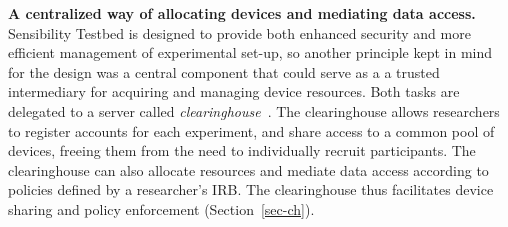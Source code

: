\textbf{A centralized way of allocating devices and mediating data access.}
Sensibility Testbed is designed to provide both enhanced security and more efficient management of experimental set-up, so another principle kept in mind for the design was a central component that could serve as a a trusted intermediary for acquiring and managing device resources. Both tasks are delegated to  a server called \textit{clearinghouse}~\cite{ch}. The clearinghouse allows researchers to 
register accounts for each experiment, and share access to a common 
pool of devices, freeing them from the need to individually recruit participants. 
The clearinghouse can also allocate resources and mediate 
data access according to policies defined by a researcher's IRB. The 
clearinghouse thus facilitates device sharing and policy enforcement 
(Section~\ref{sec-ch}).

